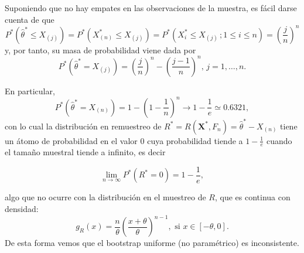 \documentclass[
]{book}
\theoremstyle{break}
\theoremstyle{nonumberplain}
\begin{document}
Suponiendo que no hay empates en las observaciones de la muestra, es fácil darse cuenta de que
\[P^{\ast}\left( \hat{\theta}^{\ast}\leq X_{(j)} \right)
=P^{\ast}\left( X_{(n)}^{\ast}\leq X_{(j)
} \right) =P^{\ast}\left( X_i^{\ast}\leq X_{(j)}\,;
 1 \leq i \leq n \right) =\left( \frac{j}{n} \right)^{n}\]
y, por tanto, su masa de probabilidad viene dada por
\[P^{\ast}\left( \hat{\theta}^{\ast}=X_{(j)} \right) =\left( 
\frac{j}{n} \right)^{n}-\left( \frac{j-1}{n} \right)^{n}\text{, }j=1,\ldots,n.\]

En particular,
\[P^{\ast}\left( \hat{\theta}^{\ast}=X_{(n)} \right) =1-\left( 1-
\frac{1}{n} \right)^{n}\rightarrow 1-\frac{1}{e}\simeq 0.6321,\]
con lo cual la distribución en remuestreo de \(R^{\ast}=R\left( \mathbf{X}^{\ast},F_n \right) =\hat{\theta}^{\ast}-X_{\left( n \right)}\) tiene un átomo de probabilidad en el valor \(0\) cuya
probabilidad tiende a \(1-\frac{1}{e}\) cuando el tamaño muestral tiende a infinito, es decir

\[\lim_{n\rightarrow \infty }P^{\ast}\left( R^{\ast}=0 \right) =1-\frac{1}{e},\]

algo que no ocurre con la distribución en el muestreo de \(R\), que es continua con densidad:
\[g_R\left( x \right) =\frac{n}{\theta }\left( \frac{x + \theta}{\theta } \right)^{n-1},
\text{ si }x\in \left[ -\theta, 0\right].\]
De esta forma vemos que el bootstrap uniforme (no paramétrico) es inconsistente.
\end{document}
